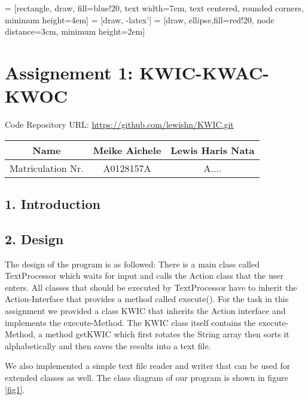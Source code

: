 \documentclass[12pt,a4paper]{report}
\begin{document}
 = [rectangle, draw, fill=blue!20, 
    text width=7em, text centered, rounded corners, minimum height=4em]
 = [draw, -latex']
 = [draw, ellipse,fill=red!20, node distance=3cm,
    minimum height=2em]


\chapter*{Assignement 1: KWIC-KWAC-KWOC}

Code Repository URL: \url{https://github.com/lewishn/KWIC.git} 

\begin{center}
\begin{tabular}{|c|c|c|}
\hline 
Name & Meike Aichele & Lewis Haris Nata\\ 
\hline 
Matriculation Nr. & A0128157A & A.... \\ 
\hline 
\end{tabular} 
\end{center}

\section*{1. Introduction}

\section*{2. Design}
The design of the program is as followed: There is a main class called TextProcessor which waits for input and calls the Action class that the user enters. All classes that should be executed by TextProcessor have to inherit the Action-Interface that provides a method called execute(). For the task in this assignment we provided a class KWIC that inherits the Action interface and implements the execute-Method.
The KWIC class itself contains the execute-Method, a method getKWIC which first rotates the String array then sorts it alphabetically and then saves the results into a text file.

We also implemented a simple text file reader and writer that can be used for extended classes as well. The class diagram of our program is shown in figure \ref{fig1}.
\end{document}

